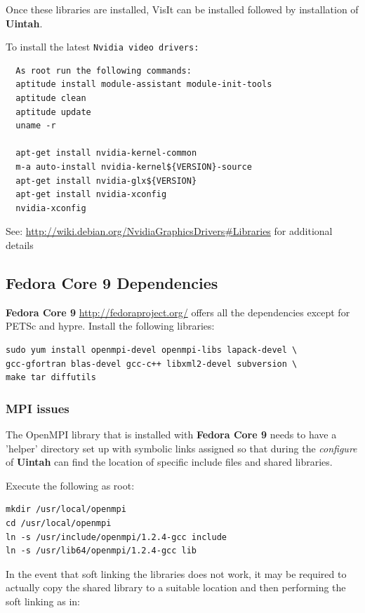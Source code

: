 \documentclass[12pt]{article}
\newcommand{\TT}[1]{\tt{#1} \normalfont}
\begin{document}
\noindent Once these libraries are installed, VisIt can be installed
followed by installation of \textbf{Uintah}.

\noindent To install the latest \TT{Nvidia}video drivers:
\begin{verbatim}
  As root run the following commands:
  aptitude install module-assistant module-init-tools
  aptitude clean
  aptitude update
  uname -r
  
  apt-get install nvidia-kernel-common
  m-a auto-install nvidia-kernel${VERSION}-source
  apt-get install nvidia-glx${VERSION}
  apt-get install nvidia-xconfig
  nvidia-xconfig
\end{verbatim}
See: \url{http://wiki.debian.org/NvidiaGraphicsDrivers#Libraries} for additional details

\subsection{Fedora Core 9 Dependencies}

\textbf{Fedora Core 9} \url{http://fedoraproject.org/} offers all the
dependencies except for PETSc and hypre.  Install the following
libraries:
\begin{verbatim}
sudo yum install openmpi-devel openmpi-libs lapack-devel \
gcc-gfortran blas-devel gcc-c++ libxml2-devel subversion \ 
make tar diffutils
\end{verbatim}

\subsubsection{MPI issues} 
\label{sec:mpi}

The OpenMPI library that is installed with \textbf{Fedora Core 9}
needs to have a 'helper' directory set up with symbolic links assigned
so that during the \emph{configure} of \textbf{Uintah} can find the
location of specific include files and shared libraries.

Execute the following as root:

\begin{Verbatim}
mkdir /usr/local/openmpi
cd /usr/local/openmpi
ln -s /usr/include/openmpi/1.2.4-gcc include
ln -s /usr/lib64/openmpi/1.2.4-gcc lib
\end{Verbatim}

In the event that soft linking the libraries does not work, it may be
required to actually copy the shared library to a suitable location
and then performing the soft linking as in:
\end{document}
